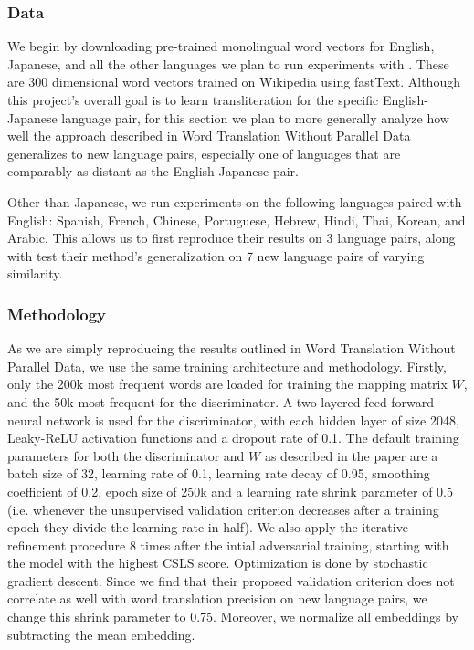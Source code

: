 \documentclass{article}
\begin{document}
\subsubsection*{Data}

We begin by downloading pre-trained monolingual word vectors for English, Japanese,
and all the other languages we plan to run experiments with \cite{bojanowski2017enriching}.
These are 300 dimensional word vectors trained on Wikipedia using fastText.
Although this project's overall goal is to learn transliteration for the specific
English-Japanese language pair, for this section we plan to more generally analyze
how well the approach described in Word Translation Without Parallel Data generalizes
to new language pairs, especially one of languages that are comparably as distant as
the English-Japanese pair.

Other than Japanese, we run experiments on the following languages paired with English:
Spanish, French, Chinese, Portuguese, Hebrew, Hindi, Thai, Korean, and Arabic. This
allows us to first reproduce their results on 3 language pairs, along with test their
method's generalization on 7 new language pairs of varying similarity.

\subsubsection*{Methodology}

As we are simply reproducing the results outlined in Word Translation Without Parallel
Data, we use the same training architecture and methodology. Firstly, only the 200k
most frequent words are loaded for training the mapping matrix $W$, and the 50k most
frequent for the discriminator. A two layered feed forward neural network is used
for the discriminator, with each hidden layer of size 2048, Leaky-ReLU activation
functions and a dropout rate of 0.1. The default training parameters for
both the discriminator and $W$ as described in the paper are a
batch size of 32, learning rate of 0.1, learning rate decay of 0.95, smoothing
coefficient of 0.2, epoch size of 250k and a learning rate shrink parameter of 0.5
(i.e. whenever the unsupervised validation criterion decreases after a training epoch
they divide the learning rate in half). We also apply the iterative refinement
procedure 8 times after the intial adversarial training, starting with the model with
the highest CSLS score. Optimization is done by stochastic gradient descent.
Since we find that their proposed validation
criterion does not correlate as well with word translation precision on new language
pairs, we change this shrink parameter to 0.75. Moreover, we normalize all embeddings
by subtracting the mean embedding.
\end{document}
